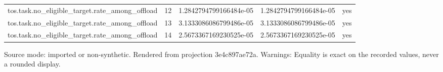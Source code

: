 {\begin{table}[htbp]
\begin{tabular}{lllll}
tos.task.no\_eligible\_target.rate\_among\_offload & 12 & 1.2842794799166484e-05 & 1.2842794799166484e-05 & yes \\
tos.task.no\_eligible\_target.rate\_among\_offload & 13 & 3.1333086086799486e-05 & 3.1333086086799486e-05 & yes \\
tos.task.no\_eligible\_target.rate\_among\_offload & 14 & 2.5673367169230525e-05 & 2.5673367169230525e-05 & yes \\
\hline
\end{tabular}
\par\footnotesize
Source mode: imported or non-synthetic.
Rendered from projection 3e4c897ae72a.
 Warnings: Equality is exact on the recorded values, never a rounded display.
\end{table}
}

